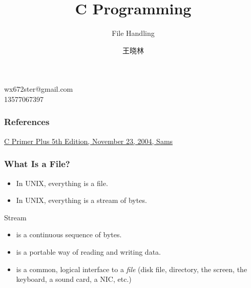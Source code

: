 \documentclass[hyperref={xetex,colorlinks,linkcolor=blue},green,compress]{beamer}
\begin{document}
\title{C Programming}\subtitle{File Handling}
\author{王晓林}

\lstset{language=C, numbers=left}

\begin{frame}
\titlepage

\vfill

\tiny{
 wx672ster@gmail.com\\
 13577067397\\
}
\end{frame}

\begin{frame}\frametitle{References}
  \begin{thebibliography}{}
    \href{http://218.194.106.3/pub/Books/tech/c/cPrimerPlus/}{C Primer
      Plus 5th Edition, November 23, 2004, Sams}
  \end{thebibliography}
\end{frame}

\begin{frame}\frametitle{What Is a File?}
  \begin{itemize}
  \item In UNIX, everything is a file.
  \item In UNIX, everything is a stream of bytes.
  \end{itemize}
  \begin{exampleblock}{Stream}
    \begin{itemize}
    \item is a continuous sequence of bytes.
    \item is a portable way of reading and writing data.
    \item is a common, logical interface to a \emph{file} (disk file,
      directory, the screen, the keyboard, a sound card, a NIC, etc.)
    \end{itemize}
  \end{exampleblock}
\end{frame}
\end{document}
